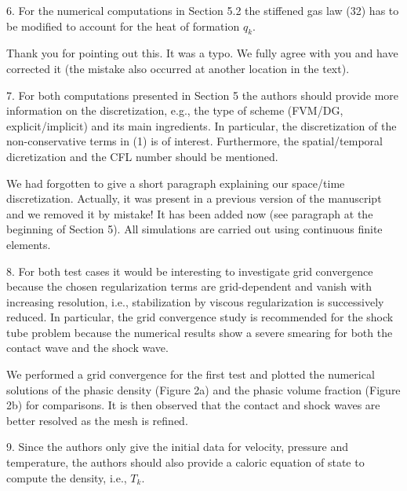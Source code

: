 \documentclass{article}
\newcommand{\tcr}[1]{\textcolor{red}{#1}}
\newcommand{\tcg}[1]{\textcolor{green}{#1}}
\begin{document}
{\color{blue}
6. For the numerical computations in Section 5.2 the stiffened gas law (32) has to be
modified to account for the heat of formation $q_k$.}

Thank you for pointing out this. It was a typo. We fully agree with you and have corrected it (the mistake also occurred at another location in the text).
\bigskip


{\color{blue}
7. For both computations presented in Section 5 the authors should provide more 
information on the discretization, e.g., the type of scheme (FVM/DG, explicit/implicit)
and its main ingredients. In particular, the discretization of the non-conservative
terms in (1) is of interest. Furthermore, the spatial/temporal dicretization and the
CFL number should be mentioned.}

We had forgotten to give a short paragraph explaining our space/time discretization.
Actually, it was present in a previous version of the manuscript and we removed it by mistake! 
It has  been added now (see paragraph at the beginning of Section 5).
All simulations are carried out using continuous finite elements.

\bigskip


{\color{blue}
8. For both test cases it would be interesting to investigate grid convergence because the
chosen regularization terms are grid-dependent and vanish with increasing resolution,
i.e., stabilization by viscous regularization is successively reduced. In particular, the
grid convergence study is recommended for the shock tube problem because the
numerical results show a severe smearing for both the contact wave and the shock
wave.}


We performed a grid convergence for the first test and plotted the numerical solutions of the phasic density (Figure 2a) and
the phasic volume fraction (Figure 2b) for comparisons. It is then observed that the contact and shock waves are better resolved as 
the mesh is refined. 

\bigskip


{\color{blue}
9. Since the authors only give the initial data for velocity, pressure and temperature,
the authors should also provide a caloric equation of state to compute the density,
i.e., $T_k$.}
\end{document}
